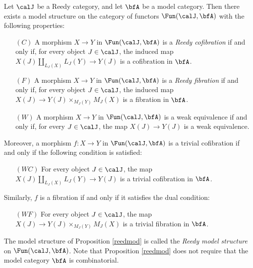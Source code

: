 \begin{proposition}\label{reedmod}
Let $\calJ$ be a Reedy category, and let $\bfA$ be a model category.
Then there exists a model structure on the category of functors $\Fun(\calJ, \bfA)$
with the following properties:
\begin{itemize}
\item[$(C)$] A morphism $X \rightarrow Y$ in $\Fun(\calJ, \bfA)$ is a 
{\it Reedy cofibration} if and only if, for every object $J \in \calJ$, the induced map
$X(J) \coprod_{ L_{J}(X) } L_{J}(Y) \rightarrow Y(J)$ is a cofibration in $\bfA$.
\item[$(F)$] A morphism $X \rightarrow Y$ in $\Fun(\calJ, \bfA)$ is a
{\it Reedy fibration} if and only if, for every object $J \in \calJ$, the induced map
$X(J) \rightarrow Y(J) \times_{ M_{J}(Y) } M_{J}(X)$ is a fibration in $\bfA$.
\item[$(W)$] A morphism $X \rightarrow Y$ in $\Fun(\calJ, \bfA)$ is a weak equivalence if and only if, for every $J \in \calJ$, the map $X(J) \rightarrow Y(J)$ is a weak equivalence.
\end{itemize} 
Moreover, a morphism $f: X \rightarrow Y$ in $\Fun( \calJ, \bfA)$ is a trivial cofibration if
and only if the following condition is satisfied:
\begin{itemize}
\item[$(WC)$] For every object $J \in \calJ$, the map $X(J) \coprod_{ L_{J}(X) } L_{J}(Y) \rightarrow Y(J)$ is a trivial cofibration in $\bfA$.
\end{itemize}
Similarly, $f$ is a fibration if and only if it satisfies the dual condition:
\begin{itemize}
\item[$(WF)$] For every object $J \in \calJ$, the map $X(J) \rightarrow Y(J) \times_{ M_J(Y)} M_{J}(X)$ is a trivial fibration in $\bfA$.
\end{itemize}
\end{proposition}

The model structure of Proposition \ref{reedmod} is called the {\it Reedy model structure} on 
$\Fun(\calJ, \bfA)$. Note that Proposition \ref{reedmod} does not require that the model category $\bfA$ is combinatorial.

